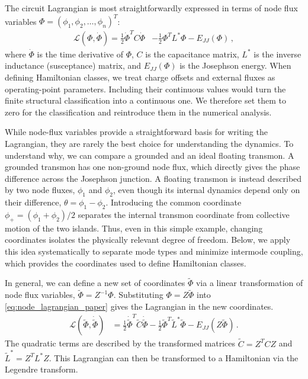 The circuit Lagrangian is most straightforwardly expressed in terms of node flux variables $\Phi = (\phi_1, \phi_2, \ldots,\phi_n )^T$:
\begin{align}\label{eq:node_lagrangian_paper}
    \mathcal{L}(\Phi, \dot \Phi) = \frac{1}{2}\dot\Phi^TC\dot\Phi &- \frac{1}{2}\Phi^TL^*\Phi  - E_{JJ}(\Phi) \, ,
\end{align}
where $\dot{\Phi}$ is the time derivative of $\Phi$, $C$ is the capacitance matrix, $L^*$ is the inverse inductance (susceptance) matrix, and $E_{JJ}(\Phi)$ is the Josephson energy. 
When defining Hamiltonian classes, we treat charge offsets and external fluxes as operating-point parameters. Including their continuous values would turn the finite structural classification into a continuous one. We therefore set them to zero for the classification and reintroduce them in the numerical analysis.

While node-flux variables provide a straightforward basis for writing the Lagrangian, they are rarely the best choice for understanding the dynamics.
To understand why, we can compare a grounded and an ideal floating transmon.
A grounded transmon has one non-ground node flux, which directly gives the phase difference across the Josephson junction.
A floating transmon is instead described by two node fluxes, $\phi_1$ and $\phi_2$, even though its internal dynamics depend only on their difference, $\theta =\phi_1-\phi_2$.
Introducing the common coordinate $\phi_+=(\phi_1+\phi_2)/2$ separates the internal transmon coordinate from collective motion of the two islands.
Thus, even in this simple example, changing coordinates isolates the physically relevant degree of freedom. Below, we apply this idea systematically to separate mode types and minimize intermode coupling, which provides the coordinates used to define Hamiltonian classes.

In general, we can define a new set of coordinates $\tilde{\Phi}$ via a linear transformation of node flux variables, $\tilde{\Phi} = Z^{-1}\Phi$. Substituting $\Phi = Z\tilde{\Phi}$ into \cref{eq:node_lagrangian_paper} gives the Lagrangian in the new coordinates.
\begin{align}\label{eq:tilde_lagrangian_paper}
    \mathcal{L}(\tilde{\Phi},\dot{\tilde{\Phi}})
    &=
    \frac{1}{2}\dot{\tilde{\Phi}}^T \tilde{C} \dot{\tilde{\Phi}}
    -
    \frac{1}{2}\tilde{\Phi}^T \tilde{L}^* \tilde{\Phi}
    -
    E_{JJ}(Z\tilde{\Phi})\,.
\end{align}
The quadratic terms are described by the transformed matrices $\tilde{C} = Z^T C Z$ and $\tilde{L}^* = Z^T L^* Z$. This Lagrangian can then be transformed to a Hamiltonian via the Legendre transform.

